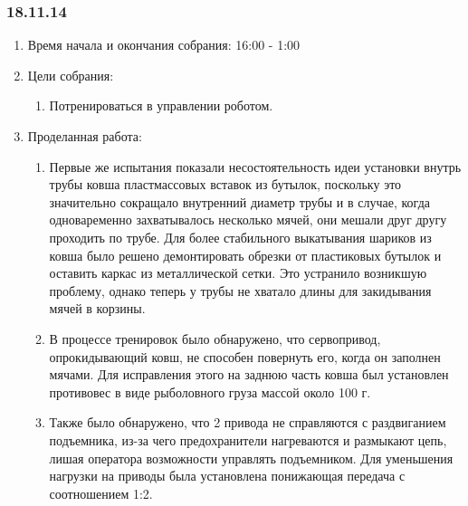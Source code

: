 \subsubsection{18.11.14}

\begin{enumerate}
	\item Время начала и окончания собрания:
	16:00 - 1:00
	\item Цели собрания:
	\begin{enumerate}
	  \item Потренироваться в управлении роботом.
	  
    \end{enumerate}
	\item Проделанная работа:
	\begin{enumerate}
	  \item Первые же испытания показали несостоятельность идеи установки внутрь трубы ковша пластмассовых вставок из бутылок, поскольку это значительно сокращало внутренний диаметр трубы и в случае, когда одноваременно захватывалось несколько мячей, они мешали друг другу проходить по трубе. Для более стабильного выкатывания шариков из ковша было решено демонтировать обрезки от пластиковых бутылок и оставить каркас из металлической сетки. Это устранило возникшую проблему, однако теперь у трубы не хватало длины для закидывания мячей в корзины.
      
      \item В процессе тренировок было обнаружено, что сервопривод, опрокидывающий ковш, не способен повернуть его, когда он заполнен мячами. Для исправления этого на заднюю часть ковша был установлен противовес в виде рыболовного груза массой около 100 г.
      
      
      \item Также было обнаружено, что 2 привода не справляются с раздвиганием подъемника, из-за чего предохранители нагреваются и размыкают цепь, лишая оператора возможности управлять подъемником. Для уменьшения нагрузки на приводы была установлена понижающая передача с соотношением 1:2.
      

\end{enumerate}
\end{enumerate}
